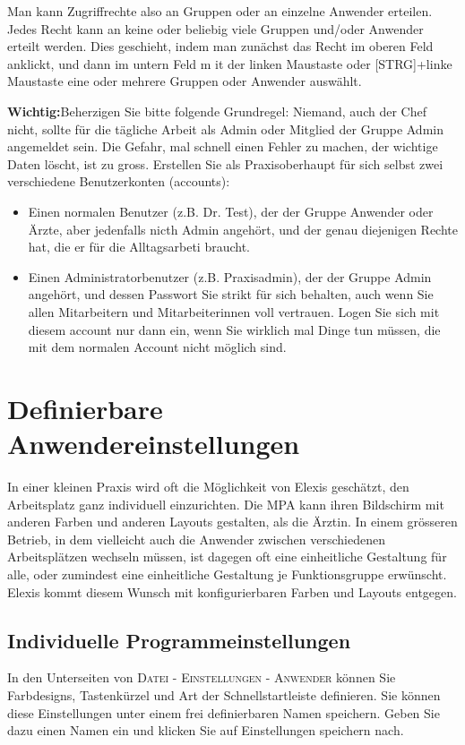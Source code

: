 Man kann Zugriffrechte also an Gruppen oder an einzelne Anwender erteilen. Jedes
Recht kann an keine oder beliebig viele Gruppen und/oder Anwender erteilt
werden. Dies geschieht, indem man zunächst das Recht im oberen Feld anklickt,
und dann im untern Feld m it der linken Maustaste oder [STRG]+linke Maustaste
eine oder mehrere Gruppen oder Anwender auswählt.

\textbf{Wichtig:}Beherzigen Sie bitte folgende Grundregel: Niemand, auch der
Chef nicht, sollte für die tägliche Arbeit als Admin oder Mitglied der Gruppe
Admin angemeldet sein. Die Gefahr, mal schnell einen Fehler zu machen, der
wichtige Daten löscht, ist zu gross. Erstellen Sie als Praxisoberhaupt für sich
selbst zwei verschiedene Benutzerkonten (accounts):
\begin{itemize}
  \item Einen normalen Benutzer (z.B. Dr. Test), der der Gruppe Anwender oder
  Ärzte, aber jedenfalls nicth Admin angehört, und der genau diejenigen Rechte
  hat, die er für die Alltagsarbeti braucht.
  \item Einen Administratorbenutzer (z.B. Praxisadmin), der der Gruppe Admin
  angehört, und dessen Passwort Sie strikt für sich behalten, auch wenn Sie
  allen Mitarbeitern und Mitarbeiterinnen voll vertrauen. Logen Sie sich mit
  diesem account nur dann ein, wenn Sie wirklich mal Dinge tun müssen, die mit
  dem normalen Account nicht möglich sind.
\end{itemize}

\section{Definierbare Anwendereinstellungen}
In einer kleinen Praxis wird oft die Möglichkeit von Elexis geschätzt, den
Arbeitsplatz ganz individuell einzurichten. Die MPA kann ihren Bildschirm mit
anderen Farben und anderen Layouts gestalten, als die Ärztin.
In einem grösseren Betrieb, in dem vielleicht auch die Anwender zwischen
verschiedenen Arbeitsplätzen wechseln müssen, ist dagegen oft eine einheitliche
Gestaltung für alle, oder zumindest eine einheitliche Gestaltung je
Funktionsgruppe erwünscht. Elexis kommt diesem Wunsch mit konfigurierbaren
Farben und Layouts entgegen.

\subsection{Individuelle Programmeinstellungen}
In den Unterseiten von \textsc{Datei - Einstellungen - Anwender} können Sie
Farbdesigns, Tastenkürzel und Art der Schnellstartleiste definieren. Sie können
diese Einstellungen unter einem frei definierbaren Namen speichern. Geben Sie
dazu einen Namen ein und klicken Sie auf \glqq Einstellungen speichern
nach\grqq{}.

